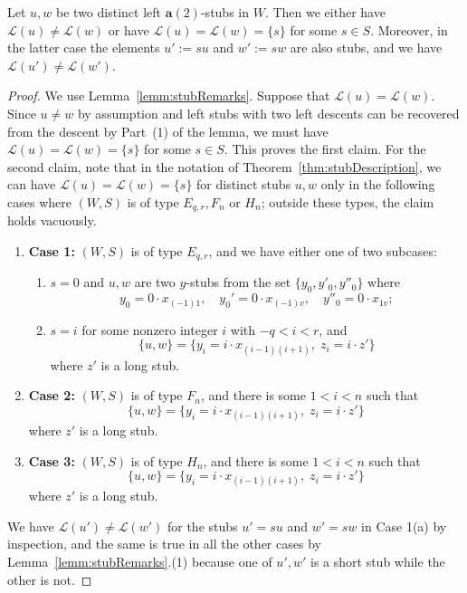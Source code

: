 \documentclass[ALCO,Unicode,published]{cedram}
\newcommand{\call}{\mathcal{L}}
\newcommand{\la}{\mathbf{a}}
\begin{document}
\begin{lemma}
    \label{lemm:stubDescents}
    Let $u,w$ be two distinct left $\la(2)$-stubs in $W$.  Then we either have $\call(u)\neq \call(w)$ or have
    $\call(u)=\call(w)=\{s\}$ for some $s\in S$. Moreover, in the latter case the elements $u':=su$ and $w':=sw$
    are also stubs, and we have $\call(u')\neq \call(w')$. 
\end{lemma}
\begin{proof} 
    We use Lemma~\ref{lemm:stubRemarks}. Suppose that $\call(u)=\call(w)$.  Since $u\neq w$ by assumption and left stubs
    with two left descents can be recovered from the descent by Part~(1) of the lemma, we must have
    $\call(u)=\call(w)=\{s\}$ for some $s\in S$. This proves the first claim.  For the second claim, note that in
    the notation of Theorem~\ref{thm:stubDescription}, we can have $\call(u)=\call(w)=\{s\}$ for distinct stubs $u,w$ only
    in the following cases where $(W,S)$ is of type $E_{q,r}, F_n$ or $H_n$; outside these types, the claim holds
    vacuously.

    \begin{enumerate}[label=\textup{(\roman*)}]
        \item \textbf{Case 1:} $(W,S)$ is of type $E_{q,r}$, and we have either one of two subcases:
            \begin{enumerate}                
                \item $s=0$ and $u,w$ are two $y$-stubs from the set $\{y_0,y'_0,y''_0\}$ where \[y_0=0\cdot
                    x_{(-1)1}, \quad y_0'=0\cdot x_{(-1)v},\quad y''_0=0\cdot x_{1v};\]
                \item $s=i$ for some nonzero integer $i$ with $-q<i<r$, and 
                    \[ 
                        \{u,w\}=\{y_i=i\cdot
                    x_{(i-1)(i+1)},\; z_i=i\cdot z'\} \] 
                    where $z'$ is a long stub.
            \end{enumerate}
        \item\textbf{Case 2:} 
            $(W,S)$ is of type $F_n$, and there is some $1<i<n$ such that 
            \[ \{u,w\}=\{y_i=i\cdot x_{(i-1)(i+1)},\; z_i=i\cdot z'\} \]
            where $z'$ is a long stub.
        \item\textbf{Case 3:} $(W,S)$ is of type $H_n$, and there is some $1<i<n$ such that 
            \[ \{u,w\}=\{y_i=i\cdot x_{(i-1)(i+1)},\; z_i=i\cdot z'\}  \]
            where $z'$ is a long stub.
    \end{enumerate} 
   We have $\call(u')\neq \call(w')$ for the stubs  $u'=su$ and $w'=sw$ in Case 1(a) by inspection,
   and the same is true in all the other cases by Lemma~\ref{lemm:stubRemarks}.(1) because one of $u',w'$
   is a short stub while the other is not.
\end{proof}
\end{document}
